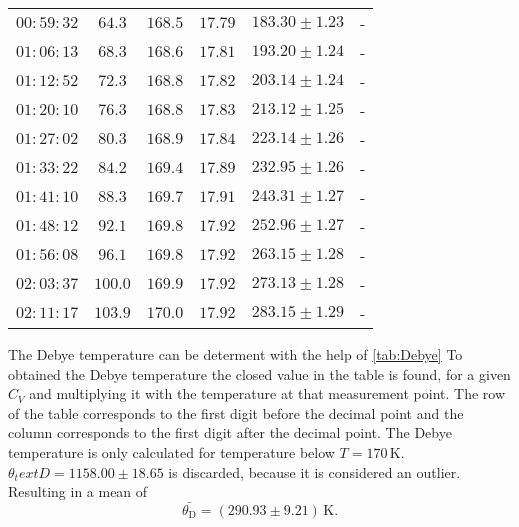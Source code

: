 \begin{table}[H]
\begin{tabular}{c c c c c c}
          $00:59:32$  &  $64.3$ &    $168.5$ &   $ 17.79$  & $183.30 \pm 1.23$&-                       \\    
          $01:06:13$  &  $68.3$ &    $168.6$ &   $ 17.81$  & $193.20 \pm 1.24$&-                       \\    
          $01:12:52$  &  $72.3$ &    $168.8$ &   $ 17.82$  & $203.14 \pm 1.24$&-                       \\    
          $01:20:10$  &  $76.3$ &    $168.8$ &   $ 17.83$  & $213.12 \pm 1.25$&-                       \\    
          $01:27:02$  &  $80.3$ &    $168.9$ &   $ 17.84$  & $223.14 \pm 1.26$&-                       \\    
          $01:33:22$  &  $84.2$ &    $169.4$ &   $ 17.89$  & $232.95 \pm 1.26$&-                       \\    
          $01:41:10$  &  $88.3$ &    $169.7$ &   $ 17.91$  & $243.31 \pm 1.27$&-                       \\    
          $01:48:12$  &  $92.1$ &    $169.8$ &   $ 17.92$  & $252.96 \pm 1.27$&-                       \\    
          $01:56:08$  &  $96.1$ &    $169.8$ &   $ 17.92$  & $263.15 \pm 1.28$&-                       \\    
          $02:03:37$  &  $100.0$&    $169.9$ &   $ 17.92$  & $273.13 \pm 1.28$&-                       \\   
          $02:11:17$  &  $103.9$&    $170.0$ &   $ 17.92$  & $283.15 \pm 1.29$&-                       \\   
    \bottomrule
    \end{tabular}
    \end{table}


The Debye temperature can be determent with the help of \autoref{tab:Debye}
To obtained the Debye temperature the closed value in the table is found, for a given $C_V$ and multiplying it with the temperature at that measurement point.
The row of the table corresponds to the first digit before the decimal point and the column corresponds
to the first digit after the decimal point. 
The Debye temperature is only calculated for temperature below $T = 170 \, \unit{\kelvin}$.
$\theta_text{D} = 1158.00\pm 18.65$ is discarded, because it is considered an outlier.
Resulting in a mean of 
\begin{equation}
    \bar{\theta_\text{D}} = \left( 290.93 \pm  9.21 \right) \,  \unit{\kelvin}.
\end{equation}


